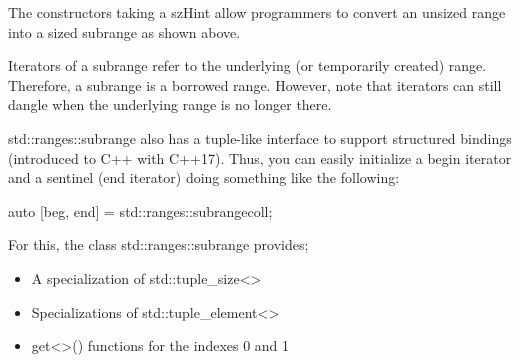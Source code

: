The constructors taking a szHint allow programmers to convert an unsized range into a sized subrange as shown above.

Iterators of a subrange refer to the underlying (or temporarily created) range. Therefore, a subrange is a borrowed range. However, note that iterators can still dangle when the underlying range is no longer there.


std::ranges::subrange also has a tuple-like interface to support structured bindings (introduced to C++ with C++17). Thus, you can easily initialize a begin iterator and a sentinel (end iterator) doing something like the following:

\begin{cpp}
auto [beg, end] = std::ranges::subrange{coll};
\end{cpp}

For this, the class std::ranges::subrange provides;

\begin{itemize}
\item
A specialization of std::tuple\_size<>

\item
Specializations of std::tuple\_element<>

\item
get<>() functions for the indexes 0 and 1
\end{itemize}

